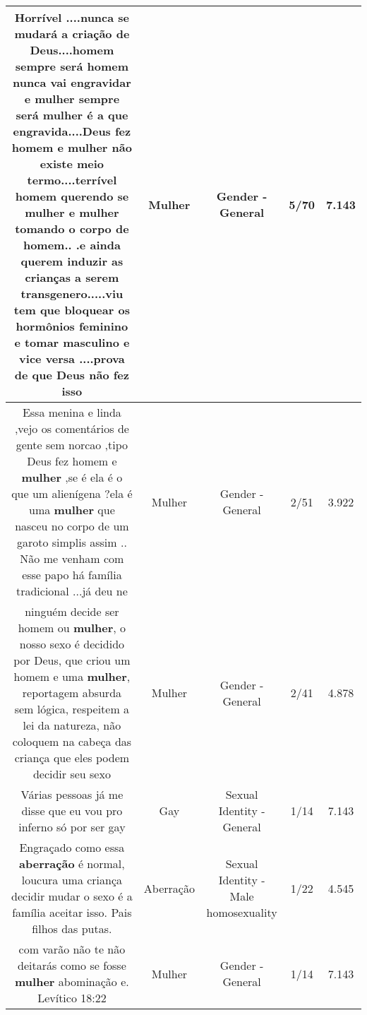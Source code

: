 \documentclass[11pt]{article}
\newlength\mylength
\begin{document}
\begin{center}
\begin{longtable}{|C{.65\mylength}|C{.30\mylength}|C{.12\mylength}|C{.12\mylength}|C{.12\mylength}|}
  \small Horrível  ....nunca se mudará a criação  de Deus....homem  sempre será homem nunca vai engravidar e \textbf{mulher} sempre  será \textbf{mulher}  é  a que engravida....Deus fez homem  e \textbf{mulher}  não existe  meio  termo....terrível homem  querendo  se \textbf{mulher}  e \textbf{mulher}  tomando  o corpo  de homem.. .e ainda  querem  induzir  as crianças  a  serem  transgenero.....viu  tem que bloquear  os  hormônios feminino  e tomar masculino e vice versa  ....prova  de  que  Deus  não  fez isso\normalsize   & Mulher & Gender - General & 5/70 & 7.143 \\  \hline
  \small Essa menina e linda ,vejo os comentários de gente sem norcao ,tipo Deus fez homem e \textbf{mulher} ,se é ela é o que um alienígena ?ela é uma \textbf{mulher} que nasceu no corpo de um garoto simplis assim .. Não me venham com esse papo há família tradicional ...já deu ne\normalsize   & Mulher & Gender - General & 2/51 & 3.922 \\  \hline
  \small ninguém decide ser homem ou \textbf{mulher}, o nosso sexo é decidido por Deus, que criou um homem e uma \textbf{mulher}, reportagem absurda sem lógica, respeitem a lei da natureza, não coloquem na cabeça das criança que eles podem decidir seu sexo\normalsize   & Mulher & Gender - General & 2/41 & 4.878 \\  \hline
  \small Várias pessoas já me disse que eu vou pro inferno só por ser gay\normalsize   & Gay & Sexual Identity - General & 1/14 & 7.143 \\  \hline
  \small Engraçado como essa \textbf{aberração} é normal, loucura uma criança decidir mudar o sexo é a família aceitar isso. Pais filhos das putas.\normalsize   & Aberração & Sexual Identity - Male homosexuality & 1/22 & 4.545 \\  \hline
  \small com varão não te não deitarás como se fosse \textbf{mulher}  abominação e. Levítico 18:22\normalsize   & Mulher & Gender - General & 1/14 & 7.143 \\  \hline

\end{longtable}
\end{center}
\end{document}
